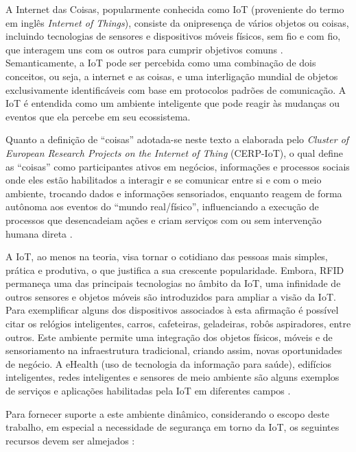 \documentclass[tid,table]{texufpel} %
\begin{document}
A Internet das Coisas, popularmente conhecida como IoT (proveniente do termo em inglês \textit{Internet of Things}), consiste da onipresença de vários objetos ou coisas, incluindo tecnologias de sensores e dispositivos móveis físicos, sem fio e com fio, que interagem uns com os outros para cumprir objetivos comuns \cite{giusto10}. Semanticamente, a IoT pode ser percebida como uma combinação de dois conceitos, ou seja, a internet e as coisas, e uma interligação mundial de objetos exclusivamente identificáveis com base em protocolos padrões de comunicação. A IoT é entendida como um ambiente inteligente que pode reagir às mudanças ou eventos que ela percebe em seu ecossistema. 

Quanto a definição de ``coisas'' adotada-se neste texto a elaborada pelo \textit{Cluster of European Research Projects on the Internet of Thing} (CERP-IoT), o qual define as ``coisas'' como participantes ativos em negócios, informações e processos sociais onde eles estão habilitados a interagir e se comunicar entre si e com o meio ambiente, trocando dados e informações sensoriados, enquanto reagem de forma autônoma aos eventos do ``mundo real/físico'', influenciando a execução de processos que desencadeiam ações e criam serviços com ou sem intervenção humana direta \cite{sundmaeker10}. 

A  IoT, ao menos na teoria, visa tornar o cotidiano das pessoas mais simples, prática e produtiva, o que justifica a sua crescente popularidade. Embora, RFID permaneça uma das principais tecnologias no âmbito da IoT, uma infinidade de outros sensores e objetos móveis são introduzidos para ampliar a visão da IoT. Para exemplificar alguns dos dispositivos associados à esta afirmação é possível citar os relógios inteligentes, carros, cafeteiras, geladeiras, robôs aspiradores, entre outros. Este ambiente permite uma integração dos objetos físicos, móveis e de sensoriamento na infraestrutura tradicional, criando assim, novas oportunidades de negócio. A eHealth (uso de tecnologia da informação para saúde), edifícios inteligentes, redes inteligentes e sensores de meio ambiente são alguns exemplos de serviços e aplicações habilitadas pela IoT em diferentes campos \cite{aman16}.

Para fornecer suporte a este ambiente dinâmico, considerando o escopo deste trabalho, em especial a necessidade de segurança em torno da IoT, os seguintes recursos devem ser almejados \cite{miorandi12}:
\end{document}
